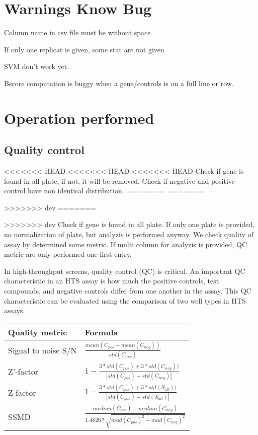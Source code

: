 \documentclass[a4paper,10pt]{article}
\begin{document}
\newpage

\section*{Warnings Know Bug}
Column name in csv file must be without space

If only one replicat is given, some stat are not given

SVM don't work yet.

Bscore computation is buggy when a gene/controls is on a full line or row.

\newpage


\section*{Operation performed}

\subsection*{Quality control}
<<<<<<< HEAD
<<<<<<< HEAD
<<<<<<< HEAD
Check if gene is found in all plate, if not, it will be removed. 
Check if negative and positive control have non identical distribution.
=======
=======

>>>>>>> dev
=======


>>>>>>> dev
Check if gene is found in all plate. If only one plate is provided, no normalization of plate, but analyzis is performed anyway.
We check quality of assay by determined some metric.
If multi column for analyzis is provided, QC metric are only performed one first entry.


In high-throughput screens, quality control (QC) is critical. An important QC characteristic in an HTS assay is how much the positive 
controls, test compounds, and negative controls differ from one another in the assay. This QC characteristic can be evaluated using the 
comparison of two well types in HTS assays.
\vspace{1cm}

\begin{tabular}{|l|l|}
\hline

Quality metric     & Formula \\
\hline
Signal to noise S/N & $ \frac{mean(C_{pos} - mean(C_{neg}))}{std(C_{neg})}$ \\
Z'-factor& $1-\frac{3*std(C_{pos})+3*std(C_{neg}))}{|std(C_{pos})-std(C_{neg})|}$\\
Z-factor & $1-\frac{3*std(C_{pos})+3*std(S_{all}))}{|std(C_{pos})-std(S_{all})|}$ \\
SSMD & $ \frac{median(C_{pos})-median(C_{neg})}{1.4826*\sqrt{mad(C_{pos})^2-mad(C_{neg})^2}}$ \\

\hline
\end{tabular}
\end{document}
